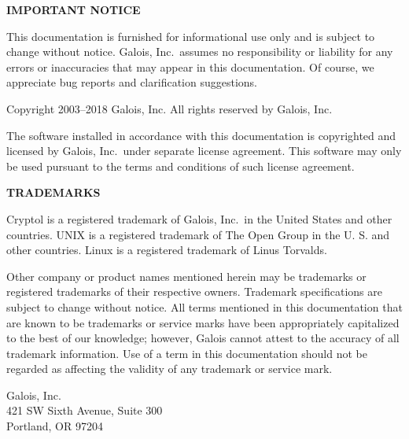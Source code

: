 \noindent
{\bf IMPORTANT NOTICE}

{\small
  This documentation is furnished for informational use only
  and is subject to change without notice. Galois, Inc.~assumes no
  responsibility or liability for any errors or inaccuracies that may
  appear in this documentation. Of course, we appreciate bug reports
  and clarification suggestions.

  Copyright 2003--2018 Galois, Inc. All rights reserved by Galois,
  Inc.

  The software installed in accordance with this documentation is
  copyrighted and licensed by Galois, Inc.~under separate license
  agreement. This software may only be used pursuant to the terms and
  conditions of such license agreement.}

\noindent
{\bf TRADEMARKS}

{\small 
  Cryptol is a registered trademark of Galois, Inc.~in the United
  States and other countries. UNIX is a registered trademark of The
  Open Group in the U. S.  and other countries. Linux is a registered
  trademark of Linus Torvalds.

  Other company or product names mentioned herein may be trademarks or
  registered trademarks of their respective owners. Trademark
  specifications are subject to change without notice. All terms
  mentioned in this documentation that are known to be trademarks or
  service marks have been appropriately capitalized to the best of our
  knowledge; however, Galois cannot attest to the accuracy of all
  trademark information. Use of a term in this documentation should
  not be regarded as affecting the validity of any trademark or
  service mark.

\vspace{0.5in}
\noindent
Galois, Inc.\\
421 SW Sixth Avenue, Suite 300 \\
Portland, OR 97204
}


